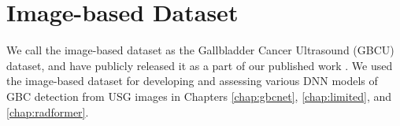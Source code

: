
%
\section{Image-based Dataset}
\label{data:gbcu}
%
We call the image-based dataset as the Gallbladder Cancer Ultrasound (GBCU) dataset, and have publicly released it as a part of our published work \cite{basu2022surpassing}. We used the image-based dataset for developing and assessing various DNN models of GBC detection from USG images in Chapters \ref{chap:gbcnet}, \ref{chap:limited}, and \ref{chap:radformer}. 

